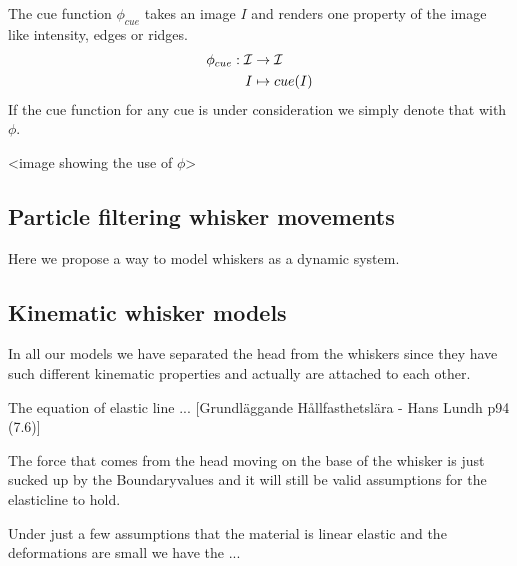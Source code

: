 \begin{definition}
    The cue function $\phi_{cue}$ takes an image $I$ and renders one property of the
    image like intensity, edges or ridges.
    \begin{equation}
        \begin{split}
            \phi_{cue} : \mathcal{I} &\rightarrow \mathcal{I}\\
                I &\mapsto cue(I)
        \end{split}
    \end{equation}
    If the cue function for any cue is under consideration we simply denote that with $\phi$.
\end{definition}


<image showing the use of $\phi$>


\subsection{Particle filtering whisker movements}
Here we propose a way to model whiskers as a dynamic system.

\subsection{Kinematic whisker models}

In all our models we have separated the head from the whiskers since they have
such different kinematic properties and actually are attached to each other.




The equation of elastic line ... [Grundläggande Hållfasthetslära - Hans Lundh
p94 (7.6)]

The force that comes from the head moving on the base of the whisker is just 
sucked up by the Boundaryvalues and it will still be valid assumptions for the
elasticline to hold.

Under just a few assumptions that the material is linear elastic and the
deformations are small we have the ...



